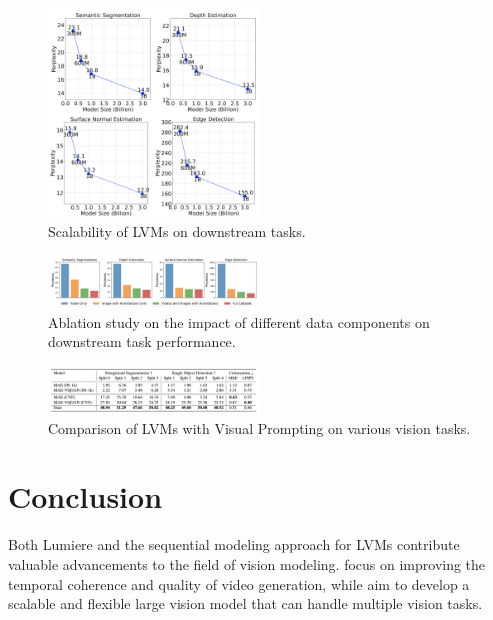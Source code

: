 \documentclass[conference]{IEEEtran}
\theoremstyle{definition}
\theoremstyle{plain}
\theoremstyle{remark}
\begin{document}
\begin{figure}[!htbp]
    \centering
    \includegraphics[width=0.5\textwidth]{downstream.png}
    \caption{Scalability of LVMs on downstream tasks.}
    \label{fig:downstream}
\end{figure}

\begin{figure}[!htbp]
    \centering
    \includegraphics[width=0.5\textwidth]{dataset-ablation.png}
    \caption{Ablation study on the impact of different data components on downstream task performance.}
    \label{fig:data-ablation}
\end{figure}

\begin{figure}
    \centering
    \includegraphics[width=0.5\textwidth]{visual-prompting.png}
    \caption{Comparison of LVMs with Visual Prompting on various vision tasks.}
    \label{fig:visual-prompting}
\end{figure}


\section{Conclusion}
Both Lumiere and the sequential modeling approach for LVMs contribute valuable advancements to the field of vision modeling.
\cite{bar2024lumiere} focus on improving the temporal coherence and quality of video generation, 
while \cite{bai2023sequential} aim to develop a scalable and flexible large vision model that can handle multiple vision tasks.









\end{document}
